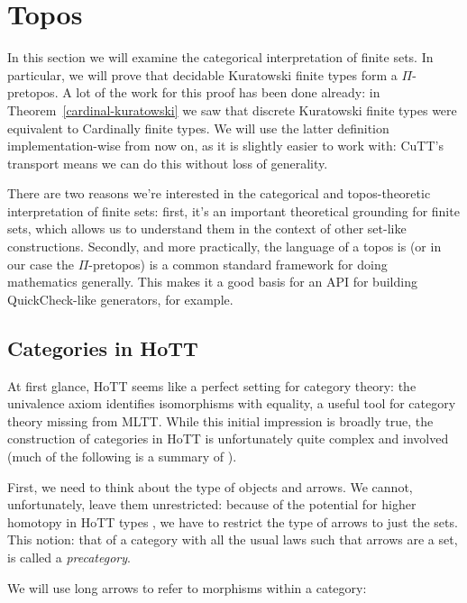 \chapter{Topos} \label{topos}
In this section we will examine the categorical interpretation of finite sets.
In particular, we will prove that decidable Kuratowski finite types form a
\(\Pi\)-pretopos.
A lot of the work for this proof has been done already: in
Theorem~\ref{cardinal-kuratowski} we saw that discrete Kuratowski finite types
were equivalent to Cardinally finite types.
We will use the latter definition implementation-wise from now on, as it is
slightly easier to work with: CuTT's transport means we can do this without loss
of generality.

There are two reasons we're interested in the categorical and topos-theoretic
interpretation of finite sets: first, it's an important theoretical grounding
for finite sets, which allows us to understand them in the context of other
set-like constructions.
Secondly, and more practically, the language of a topos is (or in our case the
\(\Pi\)-pretopos) is a common standard framework for doing mathematics
generally.
This makes it a good basis for an API for building QuickCheck-like generators,
for example.
\section{Categories in HoTT}
At first glance, HoTT seems like a perfect setting for category theory: the
univalence axiom identifies isomorphisms with equality, a useful tool for
category theory missing from MLTT.
While this initial impression is broadly true, the construction of categories in
HoTT is unfortunately quite complex and involved (much of the following is a
summary of \citet[chapter 9]{hottbook}).

First, we need to think about the type of objects and arrows.
We cannot, unfortunately, leave them unrestricted: because of the potential for
higher homotopy in HoTT types , we have
to restrict the type of arrows to just the sets.
This notion: that of a category with all the usual laws such that arrows are a
set, is called a \emph{precategory}.
\begin{agdalisting}
\end{agdalisting}
We will use long arrows to refer to morphisms within a category:
\begin{agdalisting}
\end{agdalisting}

